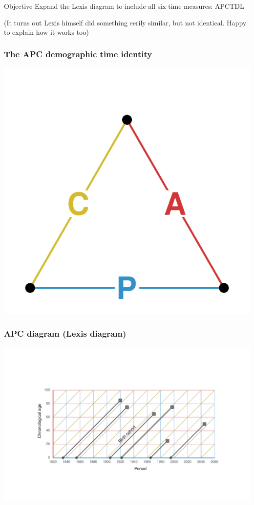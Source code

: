 \documentclass[20pt]{beamer}
\begin{document}
\begin{frame}
\begin{block}{Objective}
Expand the Lexis diagram to include all six time measures: APCTDL
\end{block}
\color{mygray}(It turns out Lexis himself did something eerily similar, but not
identical. Happy to explain how it works too)
\end{frame}

\begin{frame}
\frametitle{The APC demographic time identity}
\vspace{-4em}
\begin{center}
\includegraphics[scale=1.7]{Figures/APCid.pdf}
\end{center}
\end{frame}


\begin{frame}
\frametitle{APC diagram (Lexis diagram)}
\begin{center}
\includegraphics[trim= 200 200 200 200, scale=1.5]{Figures/APCrt.pdf}
\end{center}
\end{frame}
\end{document}
